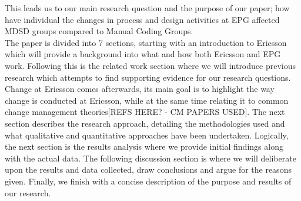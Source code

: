\documentclass[fina_report_innit.tex]{subfiles}
\begin{document}
This leads us to our main research question and the purpose of our paper; how have individual the changes in process and design activities at EPG affected MDSD groups compared to Manual Coding Groups.
\\

The paper is divided into 7 sections, starting with an introduction to Ericsson which will provide a background into what and how both Ericsson and EPG work. Following this is the related work section where we will introduce previous research which attempts to find supporting evidence for our research questions. Change at Ericsson comes afterwards, its main goal is to highlight the way change is conducted at Ericsson, while at the same time relating it to common change management theories[REFS HERE? - CM PAPERS USED]. The next section describes the research approach, detailing the methodologies used and what qualitative and quantitative approaches have been undertaken. Logically, the next section is the results analysis where we provide initial findings along with the actual data. The following discussion section is where we will deliberate upon the results and data collected, draw conclusions and argue for the reasons given. Finally, we finish with a concise description of the purpose and results of our research.
\end{document}
